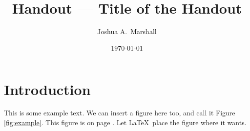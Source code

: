 \documentclass[12pt,letterpaper,fleqn,oneside]{qu-handout}
\begin{document}
\pagestyle{plain}


\renewcommand{\institution}{Queen's University at Kingston, Canada}
\renewcommand{\coursetitle}{ELEC 443 Linear Control Systems}
\renewcommand{\term}{Fall 2019}


\title{Handout --- Title of the Handout}
\author{Joshua A.~Marshall}
\date{\today}


\thispagestyle{title}

\begin{shaded}
  \begin{center}
    \Large\bf\thetitle
  \end{center}
\end{shaded}


\tableofcontents


\section{Introduction}

This is some example text.  We can insert a figure here too, and call it Figure \ref{fig:example}.  This figure is on page \pageref{fig:example}.  Let \LaTeX\ place the figure where it wants.  
\end{document}
